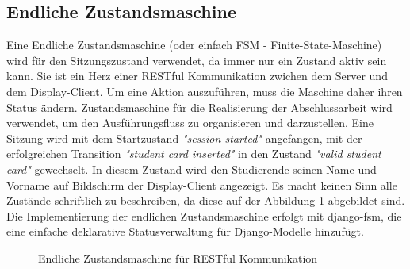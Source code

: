 \subsection{Endliche Zustandsmaschine}
\label{sec:design:fsm}
Eine Endliche Zustandsmaschine (oder einfach FSM - Finite-State-Maschine) wird für den Sitzungszustand verwendet, da immer nur ein Zustand aktiv sein kann. Sie ist ein Herz einer RESTful Kommunikation zwichen dem Server und dem Display-Client. Um eine Aktion auszuführen, muss die Maschine daher ihren Status ändern. Zustandsmaschine für die Realisierung der Abschlussarbeit wird verwendet, um den Ausführungsfluss zu organisieren und darzustellen. Eine Sitzung wird mit dem Startzustand  \textit{"session started"} angefangen, mit der erfolgreichen Transition \textit{"student card inserted"} in den Zustand \textit{"valid student card"} gewechselt. In diesem Zustand wird den Studierende seinen Name und Vorname auf Bildschirm der Display-Client angezeigt. Es macht keinen Sinn alle Zustände schriftlich zu beschreiben, da diese auf der Abbildung \ref{fig:fsm} abgebildet sind. Die Implementierung der endlichen Zustandsmaschine erfolgt mit django-fsm, die eine einfache deklarative Statusverwaltung für Django-Modelle hinzufügt.

\begin{figure}[h!]
	\centering
	\caption{Endliche Zustandsmaschine für RESTful Kommunikation}
	\label{fig:fsm}
\end{figure}